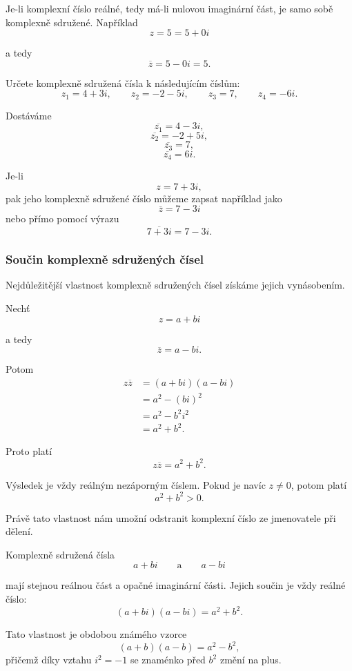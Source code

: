 \documentclass[12pt,a4paper]{article}
\begin{document}
Je-li komplexní číslo reálné, tedy má-li nulovou imaginární část, je samo sobě komplexně sdružené.
Například
\[
    z=5=5+0i
\]

a tedy
\[
    \overline{z}=5-0i=5.
\]

\begin{examplebox}
    Určete komplexně sdružená čísla k následujícím číslům:
    \[
        z_1=4+3i, \qquad z_2=-2-5i, \qquad z_3=7, \qquad z_4=-6i.
    \]

    Dostáváme
    \[
        \overline{z_1}=4-3i,
    \]
    \[
        \overline{z_2}=-2+5i,
    \]
    \[
        \overline{z_3}=7,
    \]
    \[
        \overline{z_4}=6i.
    \]
\end{examplebox}

\begin{notebox}
    Je-li
    \[
        z=7+3i,
    \]
    pak jeho komplexně sdružené číslo můžeme zapsat například jako
    \[
        \overline{z}=7-3i
    \]
    nebo přímo pomocí výrazu
    \[
        \overline{7+3i}=7-3i.
    \]
\end{notebox}



\subsubsection*{Součin komplexně sdružených čísel}
Nejdůležitější vlastnost komplexně sdružených čísel získáme jejich vynásobením.

Nechť
\[
    z=a+bi
\]

a tedy
\[
    \overline{z}=a-bi.
\]

Potom
\begin{align*}
    z\overline{z}   &= (a+bi)(a-bi)\\
                    &= a^2-(bi)^2\\
                    &= a^2-b^2i^2\\
                    &= a^2+b^2.
\end{align*}

Proto platí
\[
    z\overline{z}=a^2+b^2.
\]

Výsledek je vždy reálným nezáporným číslem. Pokud je navíc $z\neq0$, potom platí
\[
    a^2+b^2>0.
\]

Právě tato vlastnost nám umožní odstranit komplexní číslo ze jmenovatele při dělení.

\begin{notebox}
    Komplexně sdružená čísla
    \[
        a+bi
        \qquad\text{a}\qquad
        a-bi
    \]

    mají stejnou reálnou část a opačné imaginární části. 
    Jejich součin je vždy reálné číslo:
    \[
        (a+bi)(a-bi)=a^2+b^2.
    \]

    Tato vlastnost je obdobou známého vzorce
    \[
        (a+b)(a-b)=a^2-b^2,
    \]
    přičemž díky vztahu $i^2=-1$ se znaménko před $b^2$ změní na plus.
\end{notebox}
\end{document}
